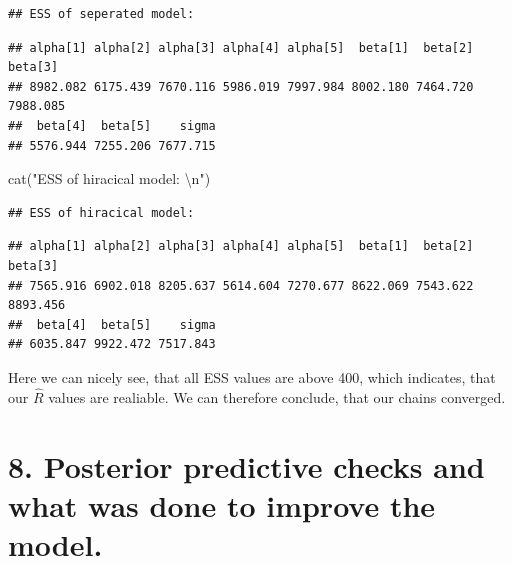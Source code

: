 \documentclass[
]{article}
\newenvironment{Shaded}{\begin{snugshade}}{\end{snugshade}}
\newcommand{\DecValTok}[1]{\textcolor[rgb]{0.00,0.00,0.81}{#1}}
\newcommand{\FunctionTok}[1]{\textcolor[rgb]{0.00,0.00,0.00}{#1}}
\newcommand{\NormalTok}[1]{#1}
\newcommand{\SpecialCharTok}[1]{\textcolor[rgb]{0.00,0.00,0.00}{#1}}
\newcommand{\StringTok}[1]{\textcolor[rgb]{0.31,0.60,0.02}{#1}}
\begin{document}
\begin{verbatim}
## ESS of seperated model:
\end{verbatim}

\begin{Shaded}
\end{Shaded}

\begin{verbatim}
## alpha[1] alpha[2] alpha[3] alpha[4] alpha[5]  beta[1]  beta[2]  beta[3] 
## 8982.082 6175.439 7670.116 5986.019 7997.984 8002.180 7464.720 7988.085 
##  beta[4]  beta[5]    sigma 
## 5576.944 7255.206 7677.715
\end{verbatim}

\begin{Shaded}
\begin{Highlighting}[]
\FunctionTok{cat}\NormalTok{(}\StringTok{"ESS of hiracical model: }\SpecialCharTok{\textbackslash{}n}\StringTok{"}\NormalTok{)}
\end{Highlighting}
\end{Shaded}

\begin{verbatim}
## ESS of hiracical model:
\end{verbatim}

\begin{Shaded}
\end{Shaded}

\begin{verbatim}
## alpha[1] alpha[2] alpha[3] alpha[4] alpha[5]  beta[1]  beta[2]  beta[3] 
## 7565.916 6902.018 8205.637 5614.604 7270.677 8622.069 7543.622 8893.456 
##  beta[4]  beta[5]    sigma 
## 6035.847 9922.472 7517.843
\end{verbatim}

Here we can nicely see, that all ESS values are above 400, which
indicates, that our \(\hat{R}\) values are realiable. We can therefore
conclude, that our chains converged.

\newpage

\hypertarget{posterior-predictive-checks-and-what-was-done-to-improve-the-model.}{%
\section{8. Posterior predictive checks and what was done to improve the
model.}\label{posterior-predictive-checks-and-what-was-done-to-improve-the-model.}}
\end{document}
